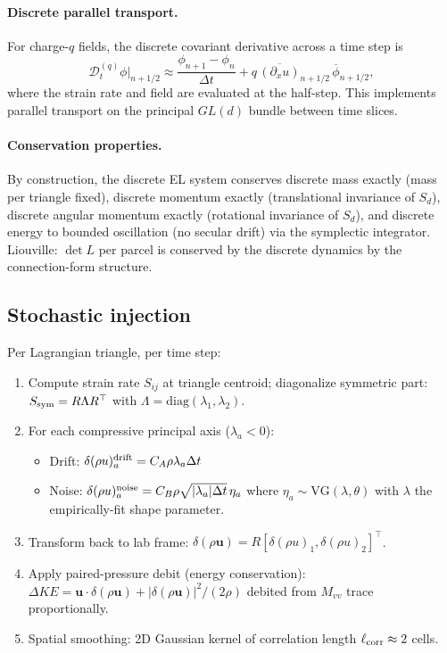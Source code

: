 \documentclass[11pt]{article}
\newcommand{\bu}{\bm{u}}
\begin{document}
\paragraph{Discrete parallel transport.} For charge-$q$ fields,
the discrete covariant derivative across a time step is
\begin{equation}
  \mathcal{D}_t^{(q)}\phi|_{n+1/2} \approx
  \frac{\phi_{n+1} - \phi_n}{\Delta t} + q\,\overline{(\partial_x u)}_{n+1/2}\,\overline\phi_{n+1/2},
\end{equation}
where the strain rate and field are evaluated at the half-step.
This implements parallel transport on the principal $GL(d)$ bundle
between time slices.

\paragraph{Conservation properties.} By construction, the discrete
EL system conserves discrete mass exactly (mass per triangle fixed),
discrete momentum exactly (translational invariance of $S_d$),
discrete angular momentum exactly (rotational invariance of $S_d$),
and discrete energy to bounded oscillation (no secular drift) via
the symplectic integrator. Liouville: $\det L$ per parcel is
conserved by the discrete dynamics by the connection-form structure.

\subsection{Stochastic injection}

Per Lagrangian triangle, per time step:
\begin{enumerate}
\item Compute strain rate $S_{ij}$ at triangle centroid;
diagonalize symmetric part: $S_{\rm sym} = R\Lambda R^\top$ with
$\Lambda = \mathrm{diag}(\lambda_1,\lambda_2)$.
\item For each compressive principal axis ($\lambda_a < 0$):
  \begin{itemize}
  \item Drift: $\delta(\rho u)_a^{\rm drift} = C_A\rho\lambda_a\Delta t$
  \item Noise: $\delta(\rho u)_a^{\rm noise} = C_B\rho\sqrt{|\lambda_a|\Delta t}\,\eta_a$
where $\eta_a\sim\mathrm{VG}(\lambda,\theta)$ with $\lambda$ the
empirically-fit shape parameter.
  \end{itemize}
\item Transform back to lab frame: $\delta(\rho\bu) = R[\delta(\rho u)_1, \delta(\rho u)_2]^\top$.
\item Apply paired-pressure debit (energy conservation): $\Delta KE = \bu\cdot\delta(\rho\bu) + |\delta(\rho\bu)|^2/(2\rho)$ debited from $M_{vv}$ trace proportionally.
\item Spatial smoothing: 2D Gaussian kernel of correlation length $\ell_{\rm corr}\approx 2$ cells.
\end{enumerate}
\end{document}
